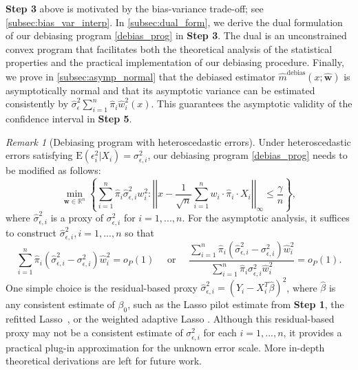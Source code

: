 \documentclass[ejsv2,noshowframe]{imsart}
\theoremstyle{plain}
\theoremstyle{definition}
\theoremstyle{remark}
\newtheorem{remark}{Remark}
\newcommand{\norm}[1]{\left|\left| #1 \right|\right|}
\renewcommand{\hat}{\widehat}
\begin{document}
{\bf Step 3} above is motivated by the bias-variance trade-off; see \autoref{subsec:bias_var_interp}. In \autoref{subsec:dual_form}, we derive the dual formulation of our debiasing program \eqref{debias_prog} in {\bf Step 3}. The dual is an unconstrained convex program that facilitates both the theoretical analysis of the statistical properties and the practical implementation of our debiasing procedure. Finally, we prove in \autoref{subsec:asymp_normal} that the debiased estimator $\hat{m}^{\text{debias}}(x;\hat{\bm{w}})$ is asymptotically normal and that its asymptotic variance can be estimated consistently by $\hat{\sigma}_{\epsilon}^2\sum_{i=1}^n \hat{\pi}_i \hat{w}_i^2(x)$. This guarantees the asymptotic validity of the confidence interval in {\bf Step 5}.

\begin{remark}[Debiasing program with heteroscedastic errors]
	\label{remark:hetero_error}
		Under heteroscedastic errors satisfying $\mathrm{E}\left(\epsilon_i^2|X_i\right) = \sigma_{\epsilon,i}^2$, our debiasing program \eqref{debias_prog} needs to be modified as follows:
	\begin{equation}
		\label{debias_prog_modified}
		\min_{\bm{w} \in \mathbb{R}^n} \left\{\sum_{i=1}^n \hat{\pi}_i \hat{\sigma}_{\epsilon,i}^2 w_i^2: \norm{x- \frac{1}{\sqrt{n}}\sum_{i=1}^n w_i\cdot \hat{\pi}_i\cdot X_i }_{\infty} \leq \frac{\gamma}{n} \right\},
	\end{equation}
	where $\hat{\sigma}_{\epsilon,i}^2$ is a proxy of $\sigma_{\epsilon,i}^2$ for $i=1,...,n$. For the asymptotic analysis, it suffices to construct $\hat{\sigma}_{\epsilon,i}^2, i=1,...,n$ so that 
	$$\sum_{i=1}^n \hat{\pi}_i \left(\hat{\sigma}_{\epsilon,i}^2 - \sigma_{\epsilon,i}^2\right) \hat{w}_i^2=o_P(1) \quad \text{ or } \quad \frac{\sum_{i=1}^n \hat{\pi}_i \left(\hat{\sigma}_{\epsilon,i}^2 - \sigma_{\epsilon,i}^2\right) \hat{w}_i^2}{\sum_{i=1}^n \hat{\pi}_i \sigma_{\epsilon,i}^2 \hat{w}_i^2}=o_P(1).$$
		One simple choice is the residual-based proxy $\hat{\sigma}_{\epsilon,i}^2 = \left(Y_i-X_i^T\hat{\beta}\right)^2$, where $\hat{\beta}$ is any consistent estimate of $\beta_0$, such as the Lasso pilot estimate from {\bf Step 1}, the refitted Lasso~\citep{belloni2013least}, or the weighted adaptive Lasso \citep{wagener2013adaptive}. Although this residual-based proxy may not be a consistent estimate of $\sigma_{\epsilon,i}^2$ for each $i=1,...,n$, it provides a practical plug-in approximation for the unknown error scale. More in-depth theoretical derivations are left for future work.
\end{remark}
\end{document}
